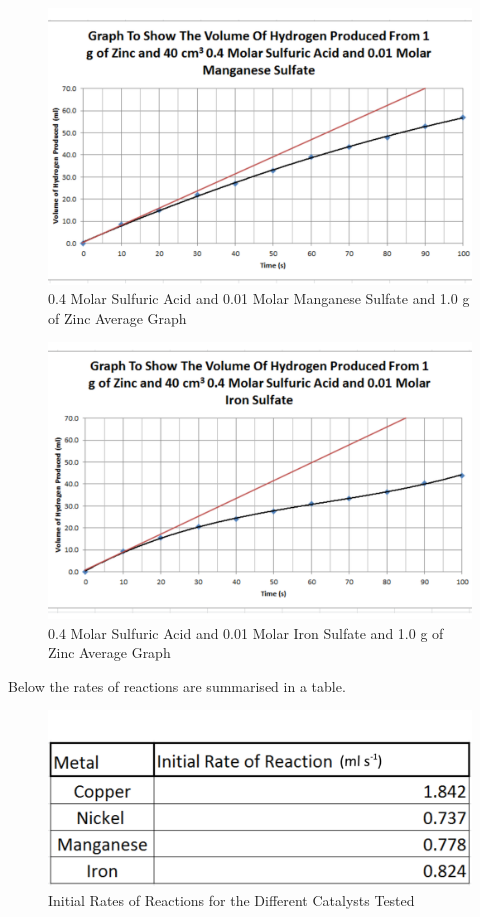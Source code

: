\begin{figure}[H]
    \includegraphics[width=\textwidth]{./Analysis/Images/4DifferentCatalysts/Manganese.pdf}
    \caption{0.4 Molar Sulfuric Acid and 0.01 Molar Manganese Sulfate and 1.0 g of Zinc Average Graph} \label{fig:ManganeseGradient}
\end{figure}

\begin{figure}[H]
    \includegraphics[width=\textwidth]{./Analysis/Images/4DifferentCatalysts/Iron.pdf}
    \caption{0.4 Molar Sulfuric Acid and 0.01 Molar Iron Sulfate and 1.0 g of Zinc Average Graph} \label{fig:IronGradient}
\end{figure}

Below the rates of reactions are summarised in a table.

\begin{figure}[H]
    \includegraphics[width=\textwidth]{./Analysis/Images/4DifferentCatalysts/Rates.pdf}
    \caption{Initial Rates of Reactions for the Different Catalysts Tested} \label{fig:RatesDiffCat}
\end{figure}


